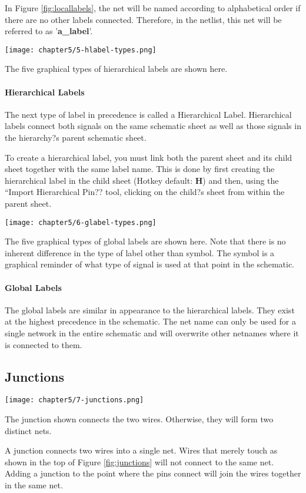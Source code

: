 In Figure \ref{fig:locallabels}, the net will be named according to alphabetical order if there are no other labels connected.
Therefore, in the netlist, this net will be referred to as '\textbf{a\_label}'.

\begin{marginfigure}
	\texttt{[image: chapter5/5-hlabel-types.png]}
	\caption[Hierarchical Labels]{
		The five graphical types of hierarchical labels are shown here.
	}
	\label{fig:hlabel-types}
\end{marginfigure}
\paragraph{Hierarchical Labels} The next type of label in precedence is called a Hierarchical Label.
Hierarchical labels connect both signals on the same schematic sheet as well as those signals in the hierarchy?s parent schematic sheet.

To create a hierarchical label, you must link both the parent sheet and its child sheet together with the same label name.
This is done by first creating the hierarchical label in the child sheet (Hotkey default: \textbf{H}) and then, using the ``Import Hierarchical Pin?? tool, clicking on the child?s sheet from within the parent sheet.

\begin{marginfigure}
	\texttt{[image: chapter5/6-glabel-types.png]}
	\caption[Global Labels]{
		The five graphical types of global labels are shown here.
		Note that there is no inherent difference in the type of label other than symbol.
		The symbol is a graphical reminder of what type of signal is used at that point in the schematic.
	}
	\label{fig:glabel-types}
\end{marginfigure}
\paragraph{Global Labels} The global labels are similar in appearance to the hierarchical labels.
They exist at the highest precedence in the schematic.
The net name can only be used for a single network in the entire schematic and will overwrite other netnames where it is connected to them.

\subsection{Junctions}
\begin{marginfigure}
	\texttt{[image: chapter5/7-junctions.png]}
	\caption[Wires with and without a junction]{
		The junction shown connects the two wires.
		Otherwise, they will form two distinct nets.
	}
	\label{fig:junctions}
\end{marginfigure}
A junction connects two wires into a single net.
Wires that merely touch as shown in the top of Figure \ref{fig:junctions} will not connect to the same net.
Adding a junction to the point where the pins connect will join the wires together in the same net.

